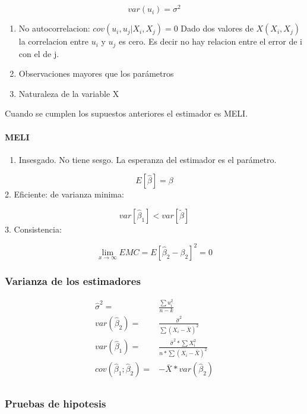 \documentclass[
]{article}
\providecommand{\tightlist}{%
  \setlength{\itemsep}{0pt}\setlength{\parskip}{0pt}}
\begin{document}
\[
  var(u_i)=\sigma^2
\]

\begin{enumerate}
\def\labelenumi{\arabic{enumi}.}
\setcounter{enumi}{4}
\item
  No autocorrelacion: \(cov(u_i,u_j|X_i,X_j)=0\) Dado dos valores de
  \(X(X_i,X_j)\) la correlacion entre \(u_i\) y \(u_j\) es cero. Es
  decir no hay relacion entre el error de i con el de j.
\item
  Observaciones mayores que los parámetros
\item
  Naturaleza de la variable X
\end{enumerate}

Cuando se cumplen los supuestos anteriores el estimador es MELI.

\hypertarget{meli}{%
\paragraph{MELI}\label{meli}}

\begin{enumerate}
\def\labelenumi{\arabic{enumi}.}
\tightlist
\item
  Insesgado. No tiene sesgo. La esperanza del estimador es el parámetro.
\end{enumerate}

\[
        E[\hat \beta]=\beta
\] 2. Eficiente: de varianza minima:

\[
  var[\hat\beta_1]<var[\tilde\beta]
\] 3. Consistencia:

\[
 \lim_{x \to \infty}EMC=E{[\hat\beta_2-\beta_2]^2}=0
\]

\hypertarget{varianza-de-los-estimadores}{%
\subsubsection{Varianza de los
estimadores}\label{varianza-de-los-estimadores}}

\[
\begin{align}
   \hat\sigma^2=&\frac{\sum{u_i^2}}{n-k} \\
    var(\hat\beta_2)=&\frac{\hat\sigma^2}{\sum{(X_i-\bar X)^2}} \\
    var(\hat\beta_1)=&\frac{\hat\sigma^2 * \sum{X_i^2}}{n*\sum{(X_i-\bar X)^2}} \\
    cov(\hat\beta_1;\hat\beta_2)=&-\bar X* var(\hat\beta_2) \\
\end{align}
\]

\hypertarget{pruebas-de-hipotesis}{%
\subsubsection{Pruebas de hipotesis}\label{pruebas-de-hipotesis}}
\end{document}

